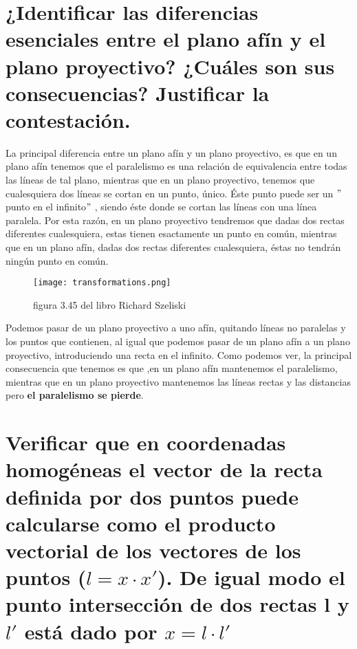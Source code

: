 \section{¿Identificar la\/s diferencia\/s esencial\/es entre el plano afín y el plano
proyectivo? ¿Cuáles son sus consecuencias? Justificar la contestación.}
La principal diferencia entre un plano afín y un plano proyectivo, es que en un plano afín tenemos que el paralelismo es una
relación de equivalencia entre todas las líneas de tal plano, mientras que en un plano proyectivo, tenemos que cualesquiera dos líneas
se cortan en un punto, único. Éste punto puede ser un $"$punto en el infinito$"$ , siendo éste donde se cortan las líneas con una línea paralela.
\newline
Por esta razón, en un plano proyectivo tendremos que dadas dos rectas diferentes cualesquiera, estas tienen esactamente un punto en común,
mientras que en un plano afín, dadas dos rectas diferentes cualesquiera, éstas no tendrán ningún punto en común.

\begin{figure}[H] %
\centering
\texttt{[image: transformations.png]}  %
\label{figura1}
\caption{figura 3.45 del libro Richard Szeliski }
\end{figure}
Podemos pasar de un plano proyectivo a uno afín, quitando líneas no paralelas y los puntos que contienen, al igual que podemos pasar
de un plano afín a un plano proyectivo, introduciendo una recta en el infinito. \newline
Como podemos ver, la principal consecuencia que tenemos es que ,en un plano afín mantenemos el paralelismo, mientras que en un plano proyectivo
mantenemos las líneas rectas y las distancias pero \textbf{el paralelismo se pierde}.
\section{Verificar que en coordenadas homogéneas el vector de la recta definida por
dos puntos puede calcularse como el producto vectorial de los vectores de los
puntos ($l = x\cdot {x}'$). De igual modo el punto intersección de dos rectas l y
 ${l}'$ está dado por $x = l\cdot {l}'$}

